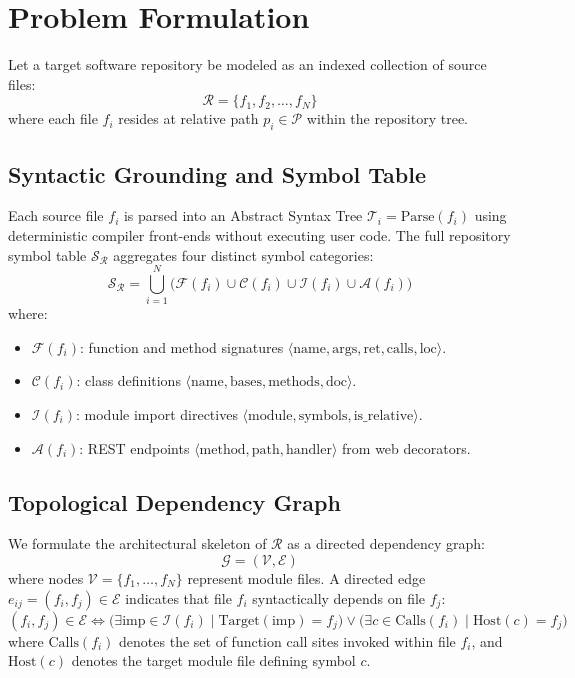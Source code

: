 \documentclass[conference]{IEEEtran}
\begin{document}
\section{Problem Formulation}
Let a target software repository be modeled as an indexed collection of source files:
\begin{equation}
\mathcal{R} = \{f_1, f_2, \dots, f_N\}
\end{equation}
where each file $f_i$ resides at relative path $p_i \in \mathcal{P}$ within the repository tree.

\subsection{Syntactic Grounding and Symbol Table}
Each source file $f_i$ is parsed into an Abstract Syntax Tree $\mathcal{T}_i = \text{Parse}(f_i)$ using deterministic compiler front-ends without executing user code. The full repository symbol table $\mathcal{S}_{\mathcal{R}}$ aggregates four distinct symbol categories:
\begin{equation}
\mathcal{S}_{\mathcal{R}} = \bigcup_{i=1}^N \Big( \mathcal{F}(f_i) \cup \mathcal{C}(f_i) \cup \mathcal{I}(f_i) \cup \mathcal{A}(f_i) \Big)
\end{equation}
where:
\begin{itemize}
    \item $\mathcal{F}(f_i)$: function and method signatures $\langle \text{name}, \text{args}, \text{ret}, \text{calls}, \text{loc} \rangle$.
    \item $\mathcal{C}(f_i)$: class definitions $\langle \text{name}, \text{bases}, \text{methods}, \text{doc} \rangle$.
    \item $\mathcal{I}(f_i)$: module import directives $\langle \text{module}, \text{symbols}, \text{is\_relative} \rangle$.
    \item $\mathcal{A}(f_i)$: REST endpoints $\langle \text{method}, \text{path}, \text{handler} \rangle$ from web decorators.
\end{itemize}

\subsection{Topological Dependency Graph}
We formulate the architectural skeleton of $\mathcal{R}$ as a directed dependency graph:
\begin{equation}
\mathcal{G} = (\mathcal{V}, \mathcal{E})
\end{equation}
where nodes $\mathcal{V} = \{f_1, \dots, f_N\}$ represent module files. A directed edge $e_{ij} = (f_i, f_j) \in \mathcal{E}$ indicates that file $f_i$ syntactically depends on file $f_j$:
\begin{equation}
(f_i, f_j) \in \mathcal{E} \iff \Big( \exists \text{imp} \in \mathcal{I}(f_i) \mid \text{Target}(\text{imp}) = f_j \Big) \lor \Big( \exists c \in \text{Calls}(f_i) \mid \text{Host}(c) = f_j \Big)
\end{equation}
where $\text{Calls}(f_i)$ denotes the set of function call sites invoked within file $f_i$, and $\text{Host}(c)$ denotes the target module file defining symbol $c$.
\end{document}
